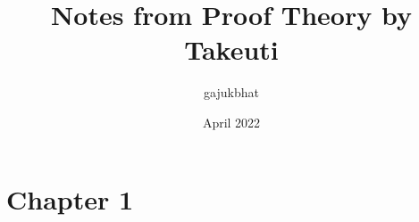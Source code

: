\documentclass{article}
\title{Notes from Proof Theory by Takeuti}
\author{gajukbhat}
\date{April 2022}
\begin{document}
\maketitle

\section{Chapter 1}
\end{document}

